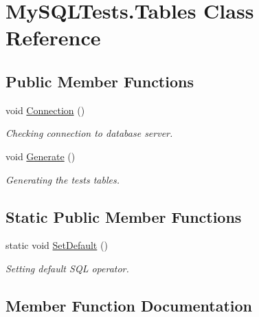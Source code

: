 \hypertarget{class_my_s_q_l_tests_1_1_tables}{}\section{My\+S\+Q\+L\+Tests.\+Tables Class Reference}
\label{class_my_s_q_l_tests_1_1_tables}
\subsection*{Public Member Functions}
\begin{DoxyCompactItemize}
\item 
void \mbox{\hyperlink{class_my_s_q_l_tests_1_1_tables_ae9a63c27e5b8bae040555a7d633de210}{Connection}} ()
\begin{DoxyCompactList}\small\item\em Checking connection to database server. \end{DoxyCompactList}\item 
void \mbox{\hyperlink{class_my_s_q_l_tests_1_1_tables_a8b0f4f83fdeedb1cba72d520644b3bd9}{Generate}} ()
\begin{DoxyCompactList}\small\item\em Generating the test\textquotesingle{}s tables. \end{DoxyCompactList}\end{DoxyCompactItemize}
\subsection*{Static Public Member Functions}
\begin{DoxyCompactItemize}
\item 
static void \mbox{\hyperlink{class_my_s_q_l_tests_1_1_tables_a2bf30026249403d4a1764d4bc88af649}{Set\+Default}} ()
\begin{DoxyCompactList}\small\item\em Setting default S\+QL operator. \end{DoxyCompactList}\end{DoxyCompactItemize}


\subsection{Member Function Documentation}
\mbox{\label{class_my_s_q_l_tests_1_1_tables_ae9a63c27e5b8bae040555a7d633de210}} 
